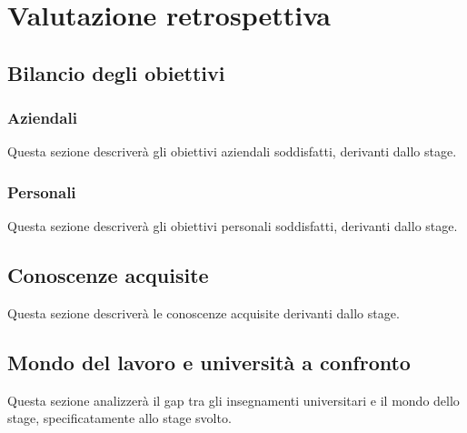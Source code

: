 

\chapter{Valutazione retrospettiva}
\label{valutazione_retrospettiva}

\section{Bilancio degli obiettivi}

	\subsection{Aziendali}
	Questa sezione descriverà gli obiettivi aziendali soddisfatti, derivanti dallo stage.
	
	\subsection{Personali}
	Questa sezione descriverà gli obiettivi personali soddisfatti, derivanti dallo stage.
	
\section{Conoscenze acquisite}
Questa sezione descriverà le conoscenze acquisite derivanti dallo stage.

\section{Mondo del lavoro e università a confronto}
Questa sezione analizzerà il gap tra gli insegnamenti universitari e il mondo dello stage, specificatamente allo stage svolto.